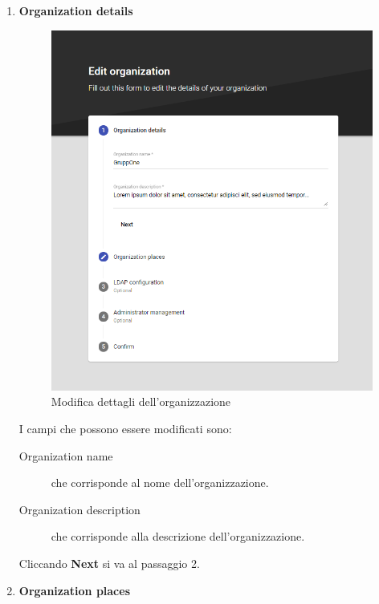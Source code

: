 \documentclass[../manuale-utente.tex]{subfiles}
\begin{document}
\begin{enumerate}
    \item \textbf{Organization details}
    
    \begin{figure}[H]
        \centering
        \includegraphics[width=120mm]{img/web-app/edit-organization/1-dettagli-organizzazione.png}
        \caption{Modifica dettagli dell'organizzazione}%
        \label{fig:web_app_modifica_dettagli_organizzazione}
    \end{figure}

    I campi che possono essere modificati sono:
    \begin{description}
        \item[Organization name] che corrisponde al nome dell'organizzazione.
        \item[Organization description] che corrisponde alla descrizione dell'organizzazione.  
    \end{description}

    Cliccando \textbf{Next} si va al passaggio 2.

    \newpage
    \item \textbf{Organization places}
    

\end{enumerate}
\end{document}

